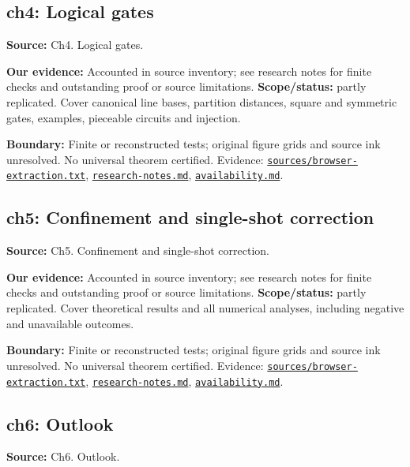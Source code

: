 \documentclass[11pt]{article}
\begin{document}
\subsection{ch4: Logical gates}
\label{claim:ch4}
\textbf{Source:} Ch4. Logical gates.

\textbf{Our evidence:} Accounted in source inventory; see research notes for finite checks and outstanding proof or source limitations. \textbf{Scope/status:} partly replicated. Cover canonical line bases, partition distances, square and symmetric gates, examples, pieceable circuits and injection.

\textbf{Boundary:} Finite or reconstructed tests; original figure grids and source ink unresolved. No universal theorem certified. Evidence: \href{https://github.com/alectionary/vibe-math/blob/master/formalization/quintavalle-hgp/sources/browser-extraction.txt}{\nolinkurl{sources/browser-extraction.txt}}, \href{https://github.com/alectionary/vibe-math/blob/master/formalization/quintavalle-hgp/research-notes.md}{\nolinkurl{research-notes.md}}, \href{https://github.com/alectionary/vibe-math/blob/master/formalization/quintavalle-hgp/availability.md}{\nolinkurl{availability.md}}.
\subsection{ch5: Confinement and single-shot correction}
\label{claim:ch5}
\textbf{Source:} Ch5. Confinement and single-shot correction.

\textbf{Our evidence:} Accounted in source inventory; see research notes for finite checks and outstanding proof or source limitations. \textbf{Scope/status:} partly replicated. Cover theoretical results and all numerical analyses, including negative and unavailable outcomes.

\textbf{Boundary:} Finite or reconstructed tests; original figure grids and source ink unresolved. No universal theorem certified. Evidence: \href{https://github.com/alectionary/vibe-math/blob/master/formalization/quintavalle-hgp/sources/browser-extraction.txt}{\nolinkurl{sources/browser-extraction.txt}}, \href{https://github.com/alectionary/vibe-math/blob/master/formalization/quintavalle-hgp/research-notes.md}{\nolinkurl{research-notes.md}}, \href{https://github.com/alectionary/vibe-math/blob/master/formalization/quintavalle-hgp/availability.md}{\nolinkurl{availability.md}}.
\subsection{ch6: Outlook}
\label{claim:ch6}
\textbf{Source:} Ch6. Outlook.
\end{document}
